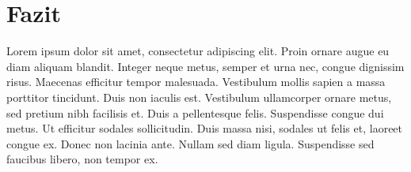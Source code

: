 \chapter{Fazit}

Lorem ipsum dolor sit amet, consectetur adipiscing elit.
Proin ornare augue eu diam aliquam blandit.
Integer neque metus, semper et urna nec, congue dignissim risus.
Maecenas efficitur tempor malesuada.
Vestibulum mollis sapien a massa porttitor tincidunt.
Duis non iaculis est.
Vestibulum ullamcorper ornare metus, sed pretium nibh facilisis et.
Duis a pellentesque felis.
Suspendisse congue dui metus.
Ut efficitur sodales sollicitudin.
Duis massa nisi, sodales ut felis et, laoreet congue ex.
Donec non lacinia ante.
Nullam sed diam ligula.
Suspendisse sed faucibus libero, non tempor ex. 
